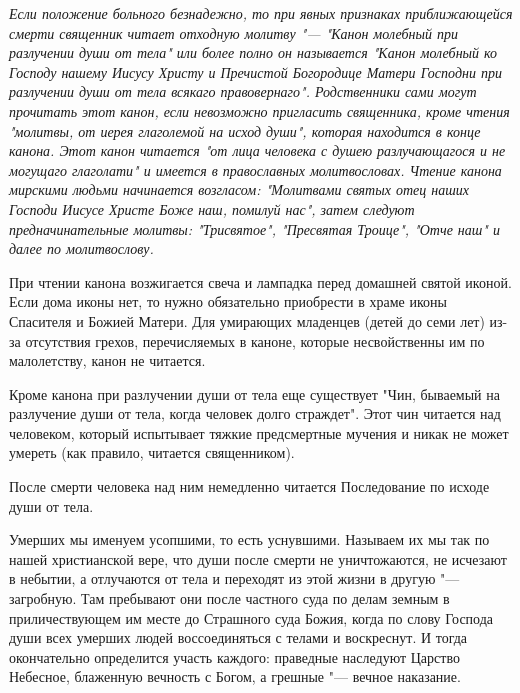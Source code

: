 


 

 


\itshape Если положение больного безнадежно, то при явных признаках приближающейся смерти священник читает отходную молитву "--- "Канон молебный при разлучении души от тела" или более полно он называется "Канон молебный ко Господу нашему Иисусу Христу и Пречистой Богородице Матери Господни при разлучении души от тела всякаго правовернаго". Родственники сами могут прочитать этот канон, если невозможно пригласить священника, кроме чтения "молитвы, от иерея глаголемой на исход души", которая находится в конце канона. Этот канон читается "от лица человека с душею разлучающагося и не могущаго глаголати" и имеется в православных молитвословах. Чтение канона мирскими людьми начинается возгласом: "Молитвами святых отец наших Господи Иисусе Христе Боже наш, помилуй нас", затем следуют предначинательные молитвы: "Трисвятое", "Пресвятая Троице", "Отче наш" и далее по молитвослову. 

При чтении канона возжигается свеча и лампадка перед домашней святой иконой. Если дома иконы нет, то нужно обязательно приобрести в храме иконы Спасителя и Божией Матери. Для умирающих младенцев (детей до семи лет) из-за отсутствия грехов, перечисляемых в каноне, которые несвойственны им по малолетству, канон не читается. 

Кроме канона при разлучении души от тела еще существует "Чин, бываемый на разлучение души от тела, когда человек долго страждет". Этот чин читается над человеком, который испытывает тяжкие предсмертные мучения и никак не может умереть (как правило, читается священником). 

После смерти человека над ним немедленно читается Последование по исходе души от тела. 

\normalfont{} 


\mychapterending

 


Умерших мы именуем усопшими, то есть уснувшими. Называем их мы так по нашей христианской вере, что души после смерти не уничтожаются, не исчезают в небытии, а отлучаются от тела и переходят из этой жизни в другую "--- загробную. Там пребывают они после частного суда по делам земным в приличествующем им месте до Страшного суда Божия, когда по слову Господа души всех умерших людей воссоединяться с телами и воскреснут. И тогда окончательно определится участь каждого: праведные наследуют Царство Небесное, блаженную вечность с Богом, а грешные "--- вечное наказание. 

